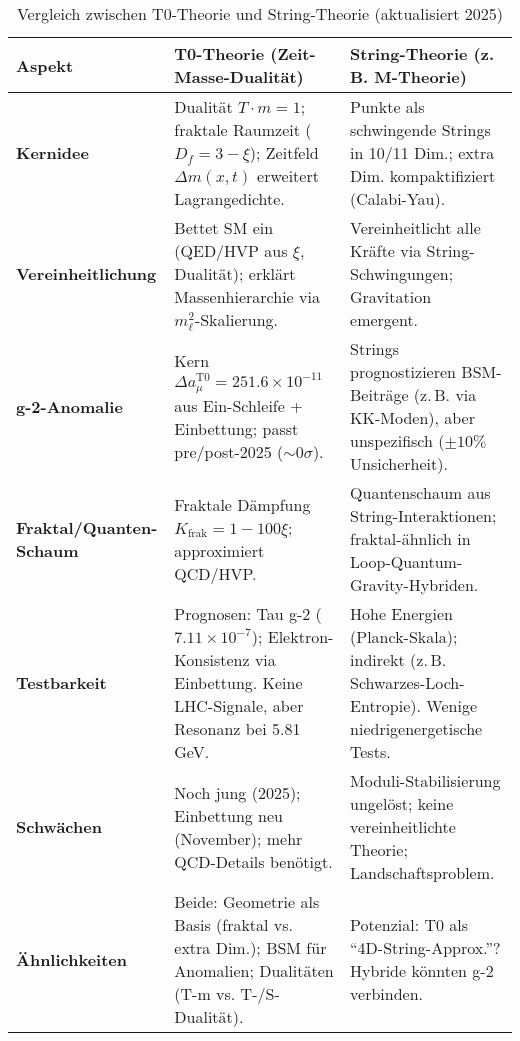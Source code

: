 \documentclass[12pt,a4paper]{article}
\begin{document}
	\begin{table}[ht]
		\centering
		\begin{tabular}{|p{4cm}|p{5cm}|p{5cm}|}
			\hline
			\textbf{Aspekt} & \textbf{T0-Theorie (Zeit-Masse-Dualität)} & \textbf{String-Theorie (z.\,B. M-Theorie)} \\
			\hline
			\textbf{Kernidee} & Dualität $T \cdot m = 1$; fraktale Raumzeit ($D_f = 3 - \xi$); Zeitfeld $\Delta m(x,t)$ erweitert Lagrangedichte. & Punkte als schwingende Strings in 10/11 Dim.; extra Dim. kompaktifiziert (Calabi-Yau). \\
			\hline
			\textbf{Vereinheitlichung} & Bettet SM ein (QED/HVP aus $\xi$, Dualität); erklärt Massenhierarchie via $m_\ell^2$-Skalierung. & Vereinheitlicht alle Kräfte via String-Schwingungen; Gravitation emergent. \\
			\hline
			\textbf{g-2-Anomalie} & Kern $\Delta a_\mu^{\text{T0}} = 251.6 \times 10^{-11}$ aus Ein-Schleife + Einbettung; passt pre/post-2025 ($\sim 0 \sigma$). & Strings prognostizieren BSM-Beiträge (z.\,B. via KK-Moden), aber unspezifisch ($\pm 10\%$ Unsicherheit). \\
			\hline
			\textbf{Fraktal/Quanten-Schaum} & Fraktale Dämpfung $K_{\text{frak}} = 1 - 100\xi$; approximiert QCD/HVP. & Quantenschaum aus String-Interaktionen; fraktal-ähnlich in Loop-Quantum-Gravity-Hybriden. \\
			\hline
			\textbf{Testbarkeit} & Prognosen: Tau g-2 ($7.11 \times 10^{-7}$); Elektron-Konsistenz via Einbettung. Keine LHC-Signale, aber Resonanz bei 5.81 GeV. & Hohe Energien (Planck-Skala); indirekt (z.\,B. Schwarzes-Loch-Entropie). Wenige niedrigenergetische Tests. \\
			\hline
			\textbf{Schwächen} & Noch jung (2025); Einbettung neu (November); mehr QCD-Details benötigt. & Moduli-Stabilisierung ungelöst; keine vereinheitlichte Theorie; Landschaftsproblem. \\
			\hline
			\textbf{Ähnlichkeiten} & Beide: Geometrie als Basis (fraktal vs. extra Dim.); BSM für Anomalien; Dualitäten (T-m vs. T-/S-Dualität). & Potenzial: T0 als ``4D-String-Approx.''? Hybride könnten g-2 verbinden. \\
			\hline
		\end{tabular}
		\caption{Vergleich zwischen T0-Theorie und String-Theorie (aktualisiert 2025)}
		\label{tab:string_comparison}
	\end{table}
	
\end{document}
